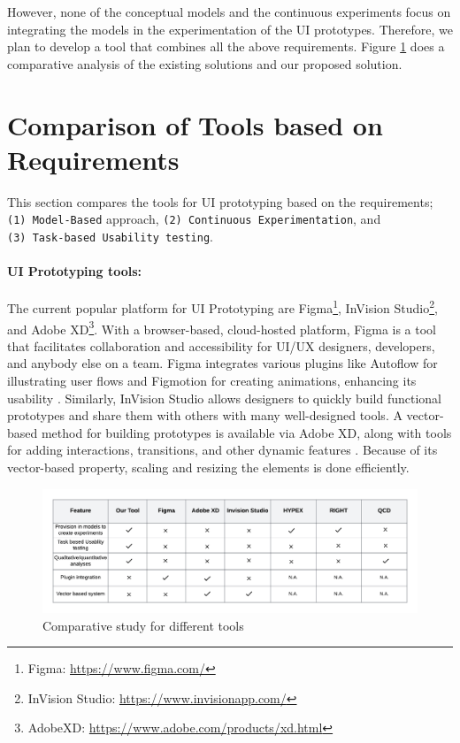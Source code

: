 However, none of the conceptual models and the continuous experiments focus on integrating the models in the experimentation of the UI prototypes.
Therefore, we plan to develop a tool that combines all the above requirements.
Figure \ref{relatedwork:img:comparative} does a comparative analysis of the existing solutions and our proposed solution.
\section{Comparison of Tools based on Requirements}
\label{csr:section:comparison}
This section compares the tools for UI prototyping based on the requirements;\\ \texttt{(1) Model-Based} approach, \texttt{(2) Continuous Experimentation}, and \\ \texttt{(3) Task-based Usability testing}.

\paragraph{UI Prototyping tools:} The current popular platform for UI Prototyping are Figma\footnote{Figma: \url{https://www.figma.com/}}, InVision Studio\footnote{InVision Studio: \url{https://www.invisionapp.com/}}, and Adobe XD\footnote{AdobeXD: \url{https://www.adobe.com/products/xd.html}}.
With a browser-based, cloud-hosted platform, Figma is a tool that facilitates collaboration and accessibility for UI/UX designers, developers, and anybody else on a team.
Figma integrates various plugins like Autoflow for illustrating user flows and Figmotion for creating animations, enhancing its usability \cite{article:comparative:prototypes}.
Similarly, InVision Studio allows designers to quickly build functional prototypes and share them with others with many well-designed tools.
A vector-based method for building prototypes is available via Adobe XD, along with tools for adding interactions, transitions, and other dynamic features \cite{article:comparative:prototypes}.
Because of its vector-based property, scaling and resizing the elements is done efficiently.

\begin{figure}[ht]
    \centering
    \includegraphics[scale=0.28]{images/related-work/Comparative.png}
    \caption{Comparative study for different tools}
    \label{relatedwork:img:comparative}
\end{figure}

